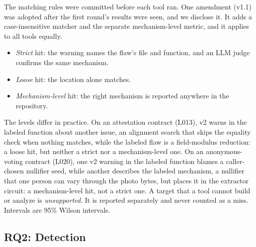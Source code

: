 The matching rules were committed before each tool ran. One amendment (v1.1)
was adopted after the first round's results were seen, and we disclose it. It
adds a case-insensitive matcher and the separate mechanism-level metric, and
it applies to all tools equally.
\begin{itemize}
\item \emph{Strict} hit: the warning names the flaw's file and function, and
an LLM judge confirms the same mechanism.
\item \emph{Loose} hit: the location alone matches.
\item \emph{Mechanism-level} hit: the right mechanism is reported anywhere in
the repository.
\end{itemize}
The levels differ in practice. On an attestation contract (L013), v2 warns
in the labeled function about another issue, an alignment search that skips
the equality check when nothing matches, while the labeled flaw is a
field-modulus reduction: a loose hit, but neither a strict nor a
mechanism-level one. On an anonymous-voting contract (L020), one v2 warning
in the labeled function blames a caller-chosen nullifier seed, while another
describes the labeled mechanism, a nullifier that one person can vary through
the photo bytes, but places it in the extractor circuit: a mechanism-level
hit, not a strict one. 
A target that a tool cannot build or analyze is \emph{unsupported}. It is
reported separately and never counted as a miss. Intervals are 95\% Wilson
intervals.

\subsection{RQ2: Detection}\label{sec:eval-rq2}


